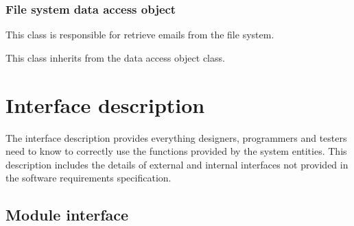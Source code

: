 \subsubsection{File system data access object}
  \begin{my_desc}
   \item[Purpose] This class is responsible for retrieve emails from the file system.
   \item[Function] This class inherits from the data access object class.
  \end{my_desc}


\section{Interface description}
The interface description provides everything designers, programmers and 
testers need to know to correctly use the functions provided by the system 
entities. This description includes the details of external and internal 
interfaces not provided in the software requirements specification.

\subsection{Module interface}

